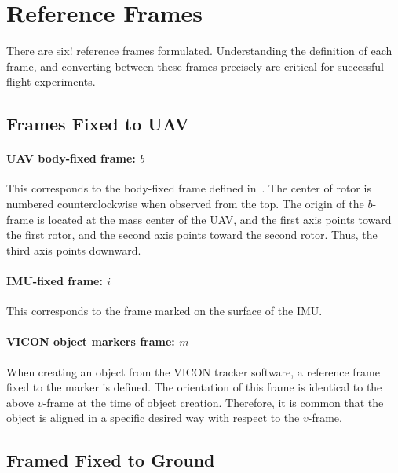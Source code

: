 \documentclass[11pt]{article}
\date{}
\begin{document}




\vspace*{0.5cm}


\section{Reference Frames}

There are six! reference frames formulated. Understanding the definition of each frame, and converting between these frames precisely are critical for successful flight experiments. 

\subsection{Frames Fixed to UAV}

\paragraph{UAV body-fixed frame: $b$} This corresponds to the body-fixed frame defined in~\cite{LeeLeoPICDC10}. The center of rotor is numbered counterclockwise when observed from the top. The origin of the $b$-frame is located at the mass center of the UAV, and the first axis points toward the first rotor, and the second axis points toward the second rotor. Thus, the third axis points downward. 

\paragraph{IMU-fixed frame: $i$} This corresponds to the frame marked on the surface of the IMU. 

\paragraph{VICON object markers frame: $m$} When creating an object from the VICON tracker software, a reference frame fixed to the marker is defined. The orientation of this frame is identical to the above $v$-frame at the time of object creation. Therefore, it is common that the object is aligned in a specific desired way with respect to the $v$-frame.


\subsection{Framed Fixed to Ground}
\end{document}
